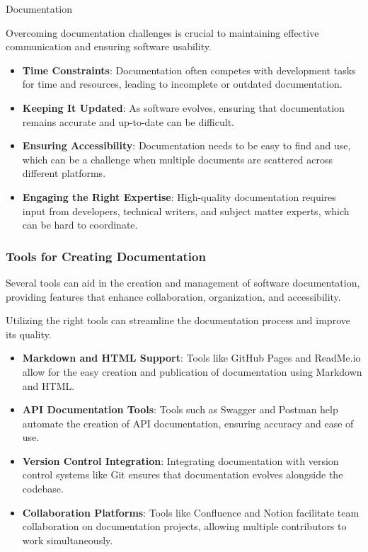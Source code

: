 \begin{notes}{Documentation}
\begin{highlight}
        Overcoming documentation challenges is crucial to maintaining effective communication and ensuring software usability.
        
        \begin{itemize}
            \item \textbf{Time Constraints}: Documentation often competes with development tasks for time and resources, leading to incomplete or outdated documentation.
            \item \textbf{Keeping It Updated}: As software evolves, ensuring that documentation remains accurate and up-to-date can be difficult.
            \item \textbf{Ensuring Accessibility}: Documentation needs to be easy to find and use, which can be a challenge when multiple documents are scattered across different platforms.
            \item \textbf{Engaging the Right Expertise}: High-quality documentation requires input from developers, technical writers, and subject matter experts, which can be hard to coordinate.
        \end{itemize}
    
    \end{highlight}
    
    \subsubsection*{Tools for Creating Documentation}
    
    Several tools can aid in the creation and management of software documentation, providing features that enhance collaboration, organization, and accessibility.
    
    \begin{highlight}
    
        Utilizing the right tools can streamline the documentation process and improve its quality.
        
        \begin{itemize}
            \item \textbf{Markdown and HTML Support}: Tools like GitHub Pages and ReadMe.io allow for the easy creation and publication of documentation using Markdown and HTML.
            \item \textbf{API Documentation Tools}: Tools such as Swagger and Postman help automate the creation of API documentation, ensuring accuracy and ease of use.
            \item \textbf{Version Control Integration}: Integrating documentation with version control systems like Git ensures that documentation evolves alongside the codebase.
            \item \textbf{Collaboration Platforms}: Tools like Confluence and Notion facilitate team collaboration on documentation projects, allowing multiple contributors to work simultaneously.
        \end{itemize}
    

\end{highlight}
\end{notes}
